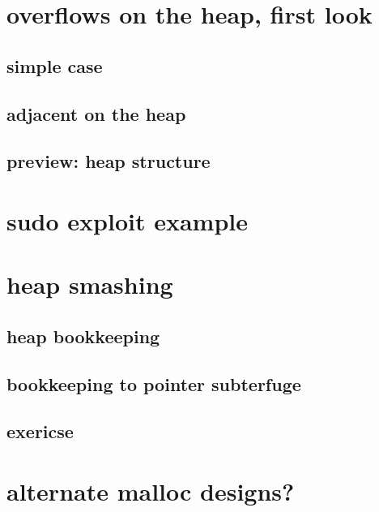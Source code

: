 \section{overflows on the heap, first look}
\subsection{simple case}


\subsection{adjacent on the heap}


\subsection{preview: heap structure}


\section{sudo exploit example}



\section{heap smashing}


\subsection{heap bookkeeping}


\subsection{bookkeeping to pointer subterfuge}


\subsection{exericse}


\section{alternate malloc designs?}


